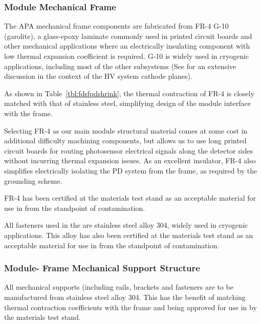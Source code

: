 \subsubsection{ Module Mechanical Frame}

The APA mechanical frame components are fabricated from FR-4 G-10 (garolite), a glass-epoxy laminate commonly used in printed circuit boards and other mechanical applications where an electrically insulating component with low thermal expansion coefficient is required.  G-10 is widely used in cryogenic applications, including most of the other  subsystems (See  for an extensive discussion in the context of the HV system cathode planes). 

As shown in Table~\ref{tbl:fdsfpdshrink}, the thermal contraction of FR-4 is closely matched with that of stainless steel, simplifying design of the module interface with the  frame.

Selecting FR-4 as our main module structural material comes at some cost in additional difficulty machining components, but allows us to use long printed circuit boards for routing photosensor electrical signals along the detector sides without incurring thermal expansion issues.  As an excellent insulator, FR-4 also simplifies electrically isolating the PD system from the  frame, as required by the  grounding scheme.

FR-4 has been certified at the  materials test stand as an acceptable material for use in  from the standpoint of  contamination.

All fasteners used in the  are stainless steel alloy 304, widely used in cryogenic applications.  This alloy has also been certified at the  materials test stand as an acceptable material for use in  from the standpoint of  contamination.

\subsubsection{ Module- Frame Mechanical Support Structure}

All  mechanical supports (including rails, brackets and fasteners are to be manufactured from stainless steel alloy 304.  This has the benefit of matching thermal contraction coefficients with the  frame and being approved for use in  by the materials test stand.

